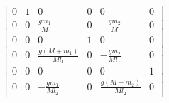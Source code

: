 \documentclass[preview]{standalone}
\begin{document}
\begin{align*}
\left[\begin{matrix}0 & 1 & 0 & 0 & 0 & 0\\0 & 0 & \frac{g m_{1}}{M} & 0 & - \frac{g m_{2}}{M} & 0\\0 & 0 & 0 & 1 & 0 & 0\\0 & 0 & \frac{g \left(M + m_{1}\right)}{M l_{1}} & 0 & - \frac{g m_{2}}{M l_{1}} & 0\\0 & 0 & 0 & 0 & 0 & 1\\0 & 0 & - \frac{g m_{1}}{M l_{2}} & 0 & \frac{g \left(M + m_{2}\right)}{M l_{2}} & 0\end{matrix}\right]
\end{align*}
\end{document}
